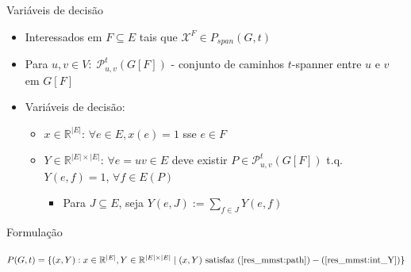 \documentclass[dvipsnames]{beamer}
\newcommand{\incid}{\mathcal{X}}
\newcommand{\espacoX}{\mathbb{R}^{|E|}}
\newcommand{\espacoY}{\mathbb{R}^{|E| \times |E|}}
\newcommand{\PGtrestricoes}{\rm{(PL)}}
\newcommand{\smallF}{\mbox{$(G[F])$}}
\newcommand{\spanPath}{\mathcal{P}}
\newcommand{\Pathuv}{\spanPath_{u,v}^{t}}
\newcommand{\PathuvF}{\Pathuv\smallF}
\begin{document}
\begin{frame}{Variáveis de decisão}
  \begin{itemize}
  \item Interessados em $F\subseteq E$ tais que $\incid^{F} \in P_{span}(G,t)$
    \item <2->Para $u,v \in V:\; \PathuvF$ - conjunto de caminhos $t$-spanner entre $u$ e $v$ em $G[F]$
  \item <3->Variáveis de decisão:
    \begin{itemize}
    \item <3->$x \in \espacoX$: $\forall e \in E, x(e) = 1$ sse $e \in F$
    \item <4->$Y \in \espacoY$: $\forall e=uv \in E$ deve existir
      $P \in \PathuvF$ t.q. $Y(e,f) = 1$,  $\forall f \in E(P)$
      \begin{itemize}
        \item <5->Para $J \subseteq E$, seja $Y(e,J):= \sum_{f \in J}Y(e,f)$
        \end{itemize}
    \end{itemize}
  \end{itemize}
\end{frame}

\begin{frame}{Formulação
  }
  \hypertarget{formmwsp}{}

{\small
\begin{lpformulation}[]
\end{lpformulation}
}

$P(G,t)= \{(x, Y): x \in \espacoX, Y \in \espacoY\; |\; (x,Y) \text{ satisfaz } (\ref{res_mmst:path})-(\ref{res_mmst:int_Y})\}$
  
\end{frame}
\end{document}
